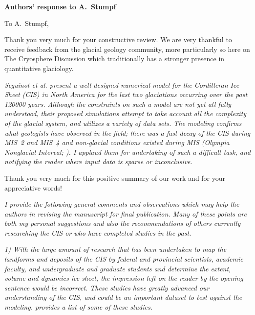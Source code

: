 


\textbf{Authors' response to A.~Stumpf}
\bigskip


\newcommand{\sechead}[1]{\bigskip\noindent\textbf{#1}}
\newcommand{\referee}[1]{\bigskip\textcolor{journalname}{\textit{#1}}}
\newcommand{\msquote}[1]{\begin{quote}\textit{#1}\end{quote}}
\newcommand{\doi}[1]{doi:\allowbreak\href{http://dx.doi.org/#1}{#1}}

To A.~Stumpf,

Thank you very much for your constructive review.
We are very thankful to receive feedback from the glacial geology community,
more particularly so here on The Cryosphere Discussion which traditionally
has a stronger presence in quantitative glaciology.

\referee{%
    Seguinot et al. present a well designed numerical model for the Cordilleran
    Ice Sheet (CIS) in North America for the last two glaciations occurring
    over the past 120000 years. Although the constraints on such a model are
    not yet all fully understood, their proposed simulations attempt to take
    account all the complexity of the glacial system, and utilizes a variety of
    data sets. The modeling confirms what geologists have observed in the
    field; there was a fast decay of the CIS during MIS~2 and MIS~4 and
    non-glacial conditions existed during MIS (Olympia Nonglacial Interval;
    \citealp[e.g.,][]{Plouffe.Jette.1997}). I applaud them for undertaking of
    such a difficult task, and notifying the reader where input data is sparse
    or inconclusive.}

Thank you very much for this positive summary of our work and for your
appreciative words!

\referee{%
    I provide the following general comments and observations which may help
    the authors in revising the manuscript for final publication. Many of these
    points are both my personal suggestions and also the recommendations of
    others currently researching the CIS or who have completed studies in the
    past.}

\referee{%
    1) With the large amount of research that has been undertaken to map the
    landforms and deposits of the CIS by federal and provincial scientists,
    academic faculty, and undergraduate and graduate students and determine the
    extent, volume and dynamics ice sheet, the impression left on the reader by
    the opening sentence would be incorrect. These studies have greatly
    advanced our understanding of the CIS, and could be an important dataset to
    test against the modeling. \citet{Stumpf.etal.2014} provides a list of some
    of these studies.}

